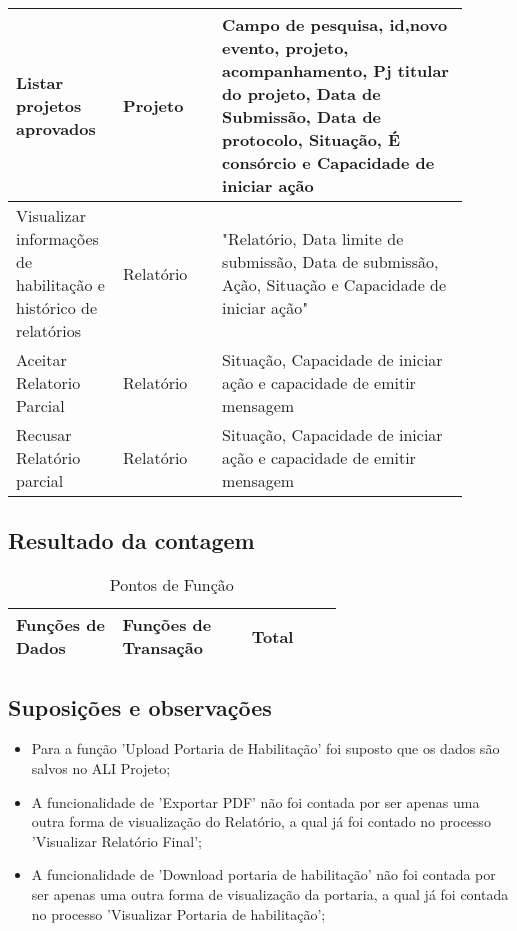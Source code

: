 \begin{longtable}{p{0.20\linewidth}p{0.20\linewidth}p{0.50\linewidth}}
    \hline
    Listar projetos aprovados&	Projeto&	Campo de pesquisa, id,novo evento,  projeto, acompanhamento, Pj titular do projeto, Data de Submissão, Data de protocolo, Situação, É consórcio e Capacidade de iniciar ação\\
    \hline
    Visualizar informações de habilitação e histórico de relatórios&	Relatório&	"Relatório, Data limite de submissão, Data de submissão, Ação, Situação e Capacidade de iniciar ação"\\

    \hline
    Aceitar Relatorio Parcial&	Relatório&	Situação, Capacidade de iniciar ação e capacidade de emitir mensagem\\

    \hline
    Recusar Relatório parcial&	Relatório&	Situação, Capacidade de iniciar ação e capacidade de emitir mensagem\\
    \hline
 \end{longtable}


\pagebreak
\subsection{Resultado da contagem}

\begin{table*}[!h]
\centering
\caption{Pontos de Função}
\label{Rotulo}
  \begin{tabular}{|p{0.20\linewidth}|p{0.25\linewidth}|p{0.20\linewidth}|}
  \hline
  \textbf{Funções de Dados} & \textbf{Funções de Transação} & \textbf{Total} \\ 
  \hline
 
  \end{tabular}
\end{table*}

\pagebreak
\subsection{Suposições e observações}

  \begin{itemize}
   \item Para a função 'Upload Portaria de Habilitação' foi suposto que os dados são salvos no ALI Projeto;
   \item A funcionalidade de 'Exportar PDF' não foi contada por ser apenas uma outra forma de visualização do Relatório, a qual já foi contado
   no processo 'Visualizar Relatório Final';
   \item A funcionalidade de 'Download portaria de habilitação' não foi contada por ser apenas uma outra forma de visualização da portaria, a qual
   já foi contada no processo 'Visualizar Portaria de habilitação';
  \end{itemize}

